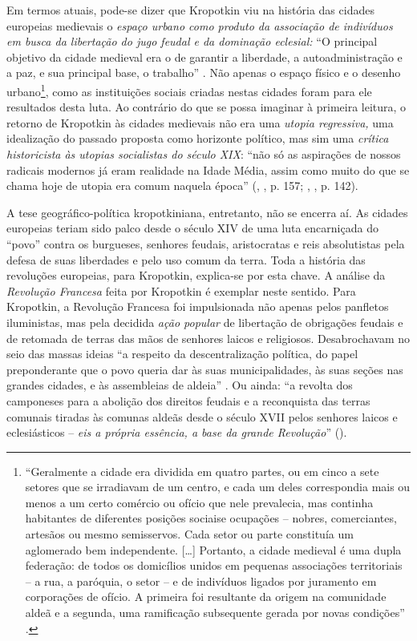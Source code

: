 Em termos atuais, pode-se dizer que Kropotkin viu na história das cidades europeias medievais o \textit{espaço urbano como produto da associação de indivíduos em busca da libertação do jugo feudal e da dominação eclesial:} ``O principal objetivo da cidade medieval era o de garantir a liberdade, a autoadministração e a paz, e sua principal base, o trabalho'' \cite[p.~142]{KROPOTKIN2009}. Não apenas o espaço físico e o desenho urbano\footnote{``Geralmente a cidade era dividida em quatro partes, ou em cinco a sete setores que se irradiavam de um centro, e cada um deles correspondia  mais ou menos a um certo comércio ou ofício que nele prevalecia, mas continha habitantes de diferentes posições sociaise ocupações -- nobres, comerciantes, artesãos ou mesmo semisservos. Cada setor ou parte constituía um aglomerado bem independente. [{\dots}] Portanto, a cidade medieval é uma dupla federação: de todos os domicílios unidos em pequenas associações territoriais -- a rua, a paróquia, o setor -- e de indivíduos ligados por juramento em corporações de ofício. A primeira foi resultante da origem na comunidade aldeã e a segunda, uma ramificação subsequente gerada por novas condições'' \cite[p.~142]{KROPOTKIN2009}.}, como as instituições sociais criadas nestas cidades foram para ele resultados desta luta. Ao contrário do que se possa imaginar à primeira leitura, o retorno de Kropotkin às cidades medievais não era uma \textit{utopia regressiva, }uma idealização do passado proposta como horizonte político, mas sim uma \textit{crítica historicista às utopias socialistas do século XIX}: ``não só as aspirações de nossos radicais modernos já eram realidade na Idade Média, assim como muito do que se chama hoje de utopia era comum naquela época'' (\citeauthor{KROPOTKIN2009}, \citeyear{KROPOTKIN2009}, p. 157; \citeauthor{HORNER1989}, \citeyear{HORNER1989}, p. 142).

A tese geográfico-política kropotkiniana, entretanto, não se encerra aí. As cidades europeias teriam sido palco desde o século XIV de uma luta encarniçada do ``povo'' contra os burgueses, senhores feudais, aristocratas e reis absolutistas pela defesa de suas liberdades e pelo uso comum da terra. Toda a história das revoluções europeias, para Kropotkin, explica-se por esta chave. A análise da  \textit{Revolução Francesa }feita por Kropotkin é exemplar neste sentido. Para Kropotkin, a Revolução Francesa foi impulsionada não apenas pelos panfletos iluministas, mas pela decidida \textit{ação popular }de libertação de obrigações feudais e de retomada de terras das mãos de senhores laicos e religiosos. Desabrochavam no seio das massas ideias ``a respeito da descentralização política, do papel preponderante que o povo queria dar às suas municipalidades, às suas seções nas grandes cidades, e às assembleias de aldeia'' \cite[p.~23]{KROPOTKIN1955}. Ou ainda: ``a revolta dos camponeses para a abolição dos direitos feudais e a reconquista das terras comunais tiradas às comunas aldeãs desde o século XVII pelos senhores laicos e eclesiásticos -- \textit{eis a própria essência, a base da grande Revolução}'' (). 

